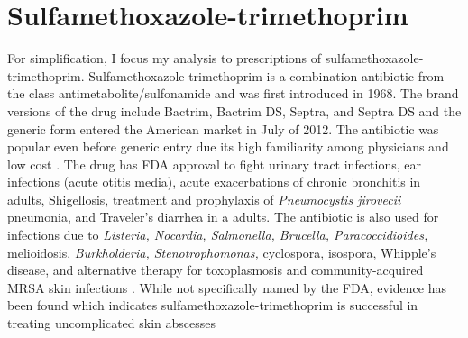\section{Sulfamethoxazole-trimethoprim}
\indent For simplification, I focus my analysis to prescriptions of sulfamethoxazole-trimethoprim. Sulfamethoxazole-trimethoprim is a combination antibiotic from the class antimetabolite/sulfonamide and was first introduced in 1968. The brand versions of the drug include Bactrim, Bactrim DS, Septra, and Septra DS and the generic form entered the American market in July of 2012. The antibiotic was popular even before generic entry due its high familiarity among physicians and low cost \cite{noauthor_sulfamethoxazole_nodate,ho_considerations_2011}. The drug has FDA approval to fight urinary tract infections, ear infections (acute otitis media), acute exacerbations of chronic bronchitis in adults, Shigellosis, treatment and prophylaxis of \textit{Pneumocystis jirovecii} pneumonia, and Traveler's diarrhea in a adults. The antibiotic is also used for infections due to \textit{Listeria, Nocardia, Salmonella, Brucella, Paracoccidioides,} melioidosis, \textit{Burkholderia, Stenotrophomonas,} cyclospora, isospora, Whipple's disease, and alternative therapy for toxoplasmosis and community-acquired MRSA skin infections \cite{schlossberg_antibiotics_2017}. While not specifically named by the FDA, evidence has been found which indicates sulfamethoxazole-trimethoprim is successful in treating uncomplicated skin abscesses \cite{noauthor_trimethoprimsulfamethoxazole_nodate}\\

